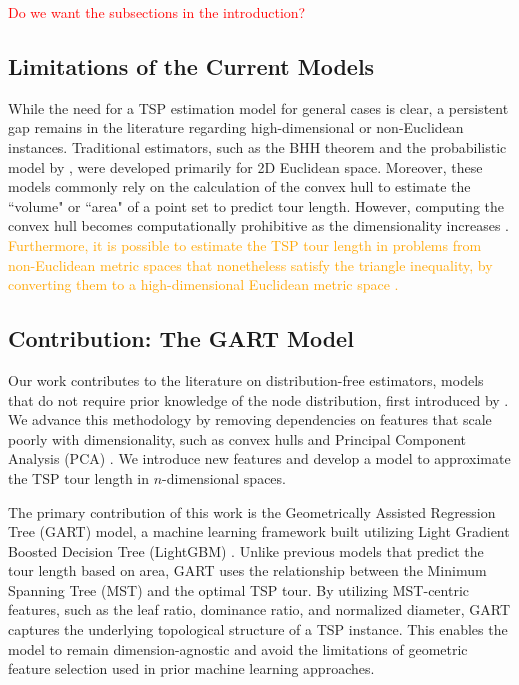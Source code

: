 \documentclass{article}
\newcommand{\stephen}[1]{\vspace{.1in}\todo[inline,color=blue!20!white]{\textbf{Stephen:} #1}}
\begin{document}
\textcolor{red}{Do we want the subsections in the introduction?}

\subsection{Limitations of the Current Models}
While the need for a TSP estimation model for general cases is clear, a persistent gap remains in the literature regarding high-dimensional or non-Euclidean instances. Traditional estimators, such as the BHH theorem \citep{bhh1959} and the probabilistic model by \cite{chien1992operational}, were developed primarily for 2D Euclidean space. 
Moreover, these models commonly rely on the calculation of the convex hull \citep{preparata1977} to estimate the ``volume" or ``area" of a point set to predict tour length. However, computing the convex hull becomes computationally prohibitive as the dimensionality increases \citep{menger1928}. 
\textcolor{orange}{Furthermore, it is possible to estimate the TSP tour length in problems from non-Euclidean metric spaces that nonetheless satisfy the triangle inequality, by converting them to a high-dimensional Euclidean metric space \citep{menger1928}.} \stephen{Stephen will move this sentence. }


\subsection{Contribution: The GART Model}
Our work contributes to the literature on distribution-free estimators, models that do not require prior knowledge of the node distribution, first introduced by \citet{cavdar2015distribution}. We advance this methodology by removing dependencies on features that scale poorly with dimensionality, such as convex hulls and Principal Component Analysis (PCA) \citep{jolliffe2002}. 
We introduce new features and develop a model to approximate the TSP tour length in $n$-dimensional spaces.  

The primary contribution of this work is the Geometrically Assisted Regression Tree (GART) model, a machine learning framework built utilizing Light  Gradient Boosted Decision Tree (LightGBM) \citep{ke2017lightgbm}. Unlike previous models that predict the tour length based on area, GART uses the relationship between the Minimum Spanning Tree (MST) and the optimal TSP tour. 
By utilizing MST-centric features, such as the leaf ratio, dominance ratio, and normalized diameter, GART captures the underlying topological structure of a TSP instance. This enables the model to remain dimension-agnostic and avoid the limitations of geometric feature selection used in prior machine learning approaches.
\end{document}
